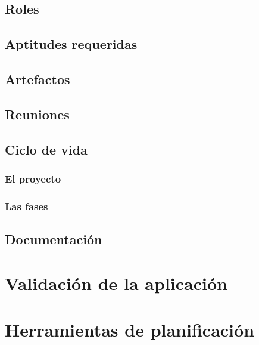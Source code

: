 \documentclass{iccmemoria}
\begin{document}
		\subsection{Roles}
		\label{sec:Roles}
		

		\subsection{Aptitudes requeridas}
		

		\subsection{Artefactos}
		\label{sec:Artefactos}
		
		
		\subsection{Reuniones}
		\label{sec:Reuniones}
		
		
		\subsection{Ciclo de vida}
		

		\subsubsection{El proyecto}
		\label{sec:Proyecto}
		

		\subsubsection{Las fases}
		\label{sec:Fases}
		

		\subsection{Documentación}
		\label{sec:Documentacion}
		

	\section{Validación de la aplicación}
		

	\section{Herramientas de planificación}
		
	
\end{document}

